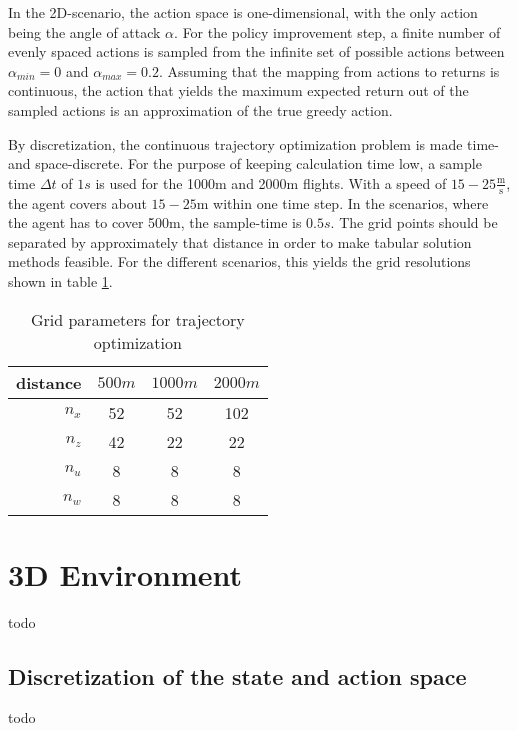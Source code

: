 In the 2D-scenario, the action space is one-dimensional, with the only action being the angle of attack $\alpha$. For the policy improvement step, a finite number of evenly spaced actions is sampled from the infinite set of possible actions between $\alpha_{min} = 0$ and $\alpha_{max}=0.2$. Assuming that the mapping from actions to returns is continuous, the action that yields the maximum expected return out of the sampled actions is an approximation of the true greedy action.

By discretization, the continuous trajectory optimization problem is made time- and space-discrete. For the purpose of keeping calculation time low, a sample time $\Delta t$ of $1s$ is used for the 1000m and 2000m flights. With a speed of $15-25 \frac{\text{m}}{\text{s}}$, the agent covers about $15-25\text{m}$ within one time step. In the scenarios, where the agent has to cover 500m, the sample-time is $0.5s$. The grid points should be separated by approximately that distance in order to make tabular solution methods feasible. For the different scenarios, this yields the grid resolutions shown in table \ref{tab:grids}.
\begin{table}
	\begin{center}
		\begin{tabular}{r|c c c}
			distance & $500m$ & $1000m$ & $2000m$ \\ \hline
			$n_x$ & 52 & 52 & 102 \\
			$n_z$ & 42 & 22 & 22\\
			$n_u$ & 8 & 8 & 8 \\
			$n_w$ & 8 & 8 & 8
		\end{tabular}
		\caption{Grid parameters for trajectory optimization}
		\label{tab:grids}
	\end{center}
\end{table}

\section{3D Environment}

todo

\subsection{Discretization of the state and action space}
\label{sec:disc3d}
todo